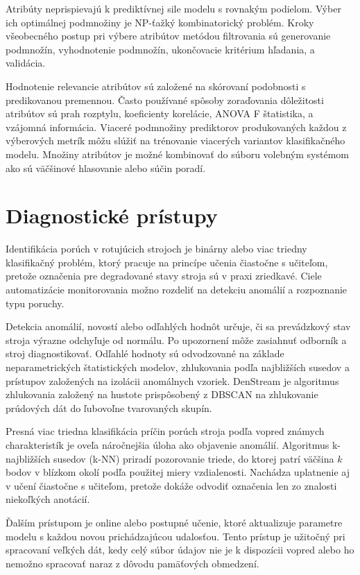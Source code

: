 Atribúty neprispievajú k prediktívnej sile modelu s rovnakým podielom. Výber ich optimálnej podmnožiny je NP-ťažký kombinatorický problém. Kroky všeobecného postup pri výbere atribútov metódou filtrovania sú generovanie podmnožín, vyhodnotenie podmnožín, ukončovacie kritérium hľadania, a validácia.

Hodnotenie relevancie atribútov sú založené na skórovaní podobnosti s predikovanou premennou. Často používané spôsoby zoraďovania dôležitosti atribútov sú prah rozptylu, koeficienty korelácie, ANOVA F štatistika, a vzájomná informácia. Viaceré podmnožiny prediktorov produkovaných každou z výberových metrík môžu slúžiť na trénovanie viacerých variantov klasifikačného modelu. Množiny atribútov je možné kombinovať do súboru volebným systémom ako sú väčšinové hlasovanie alebo súčin poradí.

\section{Diagnostické prístupy}
Identifikácia porúch v rotujúcich strojoch je binárny alebo viac triedny klasifikačný problém, ktorý pracuje na princípe učenia čiastočne s učiteľom, pretože označenia pre degradované stavy stroja sú v praxi zriedkavé. Ciele automatizácie monitorovania možno rozdeliť na detekciu anomálií a rozpoznanie typu poruchy.

Detekcia anomálií, novostí alebo odľahlých hodnôt určuje, či sa prevádzkový stav stroja výrazne odchyľuje od normálu. Po upozornení môže zasiahnuť odborník a stroj diagnostikovať. Odľahlé hodnoty sú odvodzované na základe neparametrických štatistických modelov, zhlukovania podľa najbližších susedov a prístupov založených na izolácii anomálnych vzoriek. DenStream je algoritmus zhlukovania založený na hustote prispôsobený z DBSCAN na zhlukovanie prúdových dát do ľubovoľne tvarovaných skupín.

Presná viac triedna klasifikácia príčin porúch stroja podľa vopred známych charakteristík je oveľa náročnejšia úloha ako objavenie anomálií. Algoritmus k-najbližších susedov (k-NN) priradí pozorovanie triede, do ktorej patrí väčšina $k$ bodov v blízkom okolí podľa použitej miery vzdialenosti. Nachádza uplatnenie aj v učení čiastočne s učiteľom, pretože dokáže odvodiť označenia len zo znalosti niekoľkých anotácií.

Ďalším prístupom je online alebo postupné učenie, ktoré aktualizuje parametre modelu s každou novou prichádzajúcou udalosťou. Tento prístup je užitočný pri spracovaní veľkých dát, kedy celý súbor údajov nie je k dispozícii vopred alebo ho nemožno spracovať naraz z dôvodu pamäťových obmedzení.

